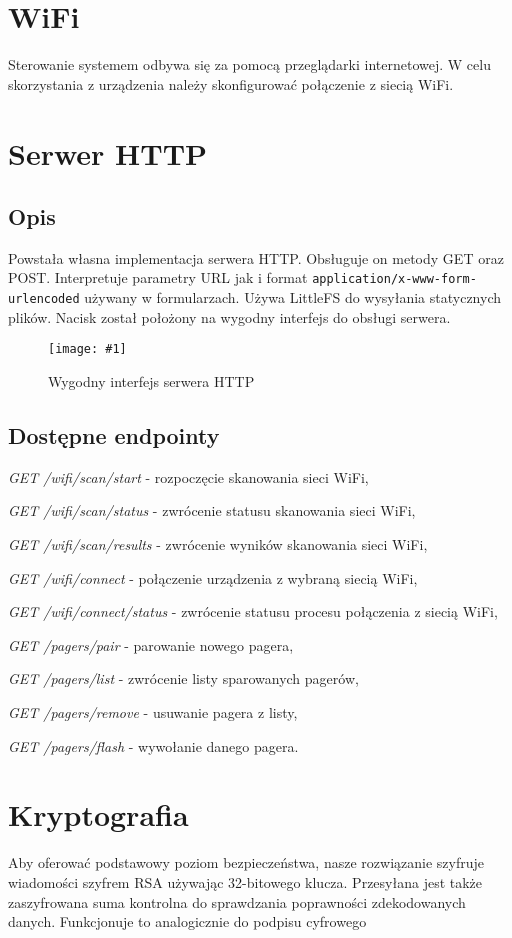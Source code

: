 \documentclass[12pt]{article}
\let\tempone\itemize
\let\temptwo\enditemize
\renewenvironment{itemize}{\tempone\setlength{\itemsep}{0cm}}{\temptwo}
\newcommand{\imgcustomsize}[3]{
	\begin{figure}[H]
		\centering
		\texttt{[image: \#1]}
		\caption{#2}
	\end{figure}
}
\newcommand{\img}[2]{\imgcustomsize{#1}{#2}{0.8}}
\begin{document}
	 \section{WiFi}
        Sterowanie systemem odbywa się za pomocą przeglądarki internetowej. W celu skorzystania z urządzenia należy skonfigurować połączenie z siecią WiFi.


	 \section{Serwer HTTP}
        \subsection{Opis}
            Powstała własna implementacja serwera HTTP. Obsługuje on metody GET oraz POST. Interpretuje parametry URL jak i format \lstinline|application/x-www-form-urlencoded| używany w formularzach. Używa LittleFS do wysyłania statycznych plików. Nacisk został położony na wygodny interfejs do obsługi serwera.
            \img{pgm/http_init}{Wygodny interfejs serwera HTTP}
        \subsection{Dostępne endpointy}
        \begin{itemize}
            \item \emph{GET /wifi/scan/start} - rozpoczęcie skanowania sieci WiFi,
            \item \emph{GET /wifi/scan/status} - zwrócenie statusu skanowania sieci WiFi,
            \item \emph{GET /wifi/scan/results} - zwrócenie wyników skanowania sieci WiFi,
            \item \emph{GET /wifi/connect} - połączenie urządzenia z wybraną siecią WiFi,
            \item \emph{GET /wifi/connect/status} - zwrócenie statusu procesu połączenia z siecią WiFi,
            \item \emph{GET /pagers/pair} - parowanie nowego pagera,
            \item \emph{GET /pagers/list} - zwrócenie listy sparowanych pagerów,
            \item \emph{GET /pagers/remove} - usuwanie pagera z listy,
            \item \emph{GET /pagers/flash} - wywołanie danego pagera.
        \end{itemize}

	 \section{Kryptografia}
	 	Aby oferować podstawowy poziom bezpieczeństwa, nasze rozwiązanie szyfruje wiadomości szyfrem RSA używając 32-bitowego klucza. Przesyłana jest także zaszyfrowana suma kontrolna do sprawdzania poprawności zdekodowanych danych. Funkcjonuje to analogicznie do podpisu cyfrowego
\end{document}
